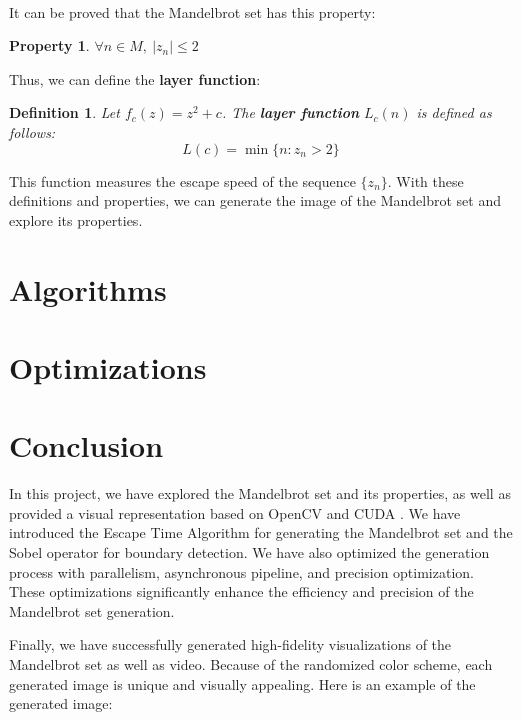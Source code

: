 \documentclass[11pt]{article}
\newtheorem{definition}{Definition}
\newtheorem{property}{Property}
\begin{document}
    It can be proved\textsuperscript{\cite{branner1989mandelbrot}} that the Mandelbrot set has this property:

    \begin{property}
        \label{prop:bounded}
        $\forall n \in M,\ |z_n| \leq 2$
    \end{property}

    Thus, we can define the \textbf{layer function}:

    \begin{definition}
        Let $f_c(z) = z^2 + c$.
        The \textbf{layer function} $L_c(n)$ is defined as follows:
        \begin{equation}
            L(c) = \min\{n : z_n > 2\}\label{eq:layer_function}
        \end{equation}
    \end{definition}

    This function measures the escape speed of the sequence $\{z_n\}$.
    With these definitions and properties, we can generate the image of the Mandelbrot set and explore its properties.


    \section{Algorithms}\label{sec:algorithms}
    

    \section{Optimizations}\label{sec:optimizations}
    


    \section{Conclusion}\label{sec:conclusion}

    In this project, we have explored the Mandelbrot set and its properties, as well as provided a visual representation
    based on OpenCV and CUDA .
    We have introduced the Escape Time Algorithm for generating the Mandelbrot set and the Sobel operator for boundary
    detection.
    We have also optimized the generation process with parallelism, asynchronous pipeline, and precision optimization.
    These optimizations significantly enhance the efficiency and precision of the Mandelbrot set generation.

    Finally, we have successfully generated high-fidelity visualizations of the Mandelbrot set as well as video.
    Because of the randomized color scheme, each generated image is unique and visually appealing.
    Here is an example of the generated image:
\end{document}

